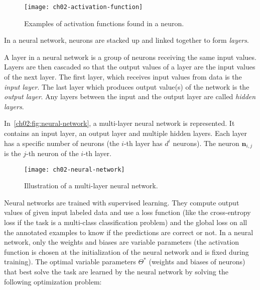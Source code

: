     \begin{figure}[h!]
      \centering
      \texttt{[image: ch02-activation-function]}
      \caption{Examples of activation functions found in a neuron.}
      \label{ch02:fig:activation-function}
    \end{figure}

    \medskip
    In a neural network, neurons are stacked up and linked together to form
    \textit{layers}.

    \theoremstyle{definition}
    \begin{definition}[A layer]
      A layer in a neural network is a group of neurons receiving the same input
      values. Layers are then cascaded so that the output values of a layer are
      the input values of the next layer. The first layer, which receives input
      values from data is the \textit{input layer}. The last layer which
      produces output value(s) of the network is the \textit{output layer}. Any
      layers between the input and the output layer are called \textit{hidden
      layers}.
    \end{definition}

    \noindent In~\autoref{ch02:fig:neural-network}, a multi-layer neural network
    is represented. It contains an input layer, an output layer and multiple
    hidden layers. Each layer has a specific number of neurons (the $i$-th layer
    has $d^i$ neurons). The neuron $\mathbf{n}_{i, j}$ is the $j$-th neuron of
    the $i$-th layer.

    \begin{figure}[t]
      \centering
      \texttt{[image: ch02-neural-network]}
      \caption{Illustration of a multi-layer neural network.}
      \label{ch02:fig:neural-network}
    \end{figure}

    \pagebreak
    Neural networks are trained with supervised learning. They compute output
    values of given input labeled data and use a loss function (like the
    cross-entropy loss if the task is a multi-class classification problem) and
    the global loss on all the annotated examples to know if the predictions are
    correct or not. In a neural network, only the weights and biases are
    variable parameters (the activation function is chosen at the initialization
    of the neural network and is fixed during training). The optimal variable
    parameters $\Theta^*$ (weights and biases of neurons) that best solve the
    task are learned by the neural network by solving the following optimization
    problem:

